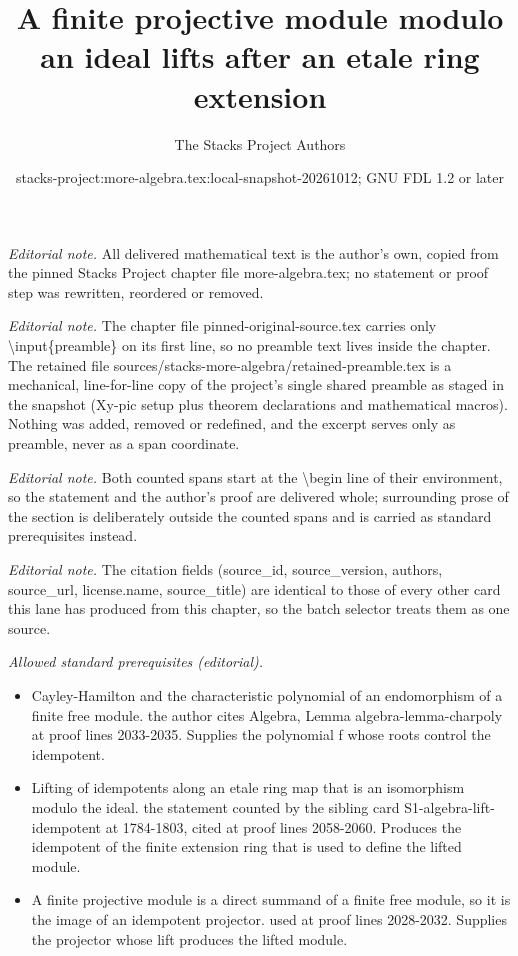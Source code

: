 \documentclass[10pt,a4paper]{amsart}
\title{A finite projective module modulo an ideal lifts after an etale ring extension}
\author{The Stacks Project Authors}
\date{stacks-project:more-algebra.tex:local-snapshot-20261012; GNU FDL 1.2 or later}
\theoremstyle{plain}
\theoremstyle{definition}
\theoremstyle{remark}
\numberwithin{equation}{subsection}
\begin{document}
\maketitle
\setcounter{subsection}{1}
\noindent\textit{Editorial note.} All delivered mathematical text is the author's own, copied from the pinned Stacks Project chapter file more-algebra.tex; no statement or proof step was rewritten, reordered or removed.\par\medskip
\noindent\textit{Editorial note.} The chapter file pinned-original-source.tex carries only \textbackslash{}input\{preamble\} on its first line, so no preamble text lives inside the chapter. The retained file sources/stacks-more-algebra/retained-preamble.tex is a mechanical, line-for-line copy of the project's single shared preamble as staged in the snapshot (Xy-pic setup plus theorem declarations and mathematical macros). Nothing was added, removed or redefined, and the excerpt serves only as preamble, never as a span coordinate.\par\medskip
\noindent\textit{Editorial note.} Both counted spans start at the \textbackslash{}begin line of their environment, so the statement and the author's proof are delivered whole; surrounding prose of the section is deliberately outside the counted spans and is carried as standard prerequisites instead.\par\medskip
\noindent\textit{Editorial note.} The citation fields (source\_id, source\_version, authors, source\_url, license.name, source\_title) are identical to those of every other card this lane has produced from this chapter, so the batch selector treats them as one source.\par\medskip
\noindent\textit{Allowed standard prerequisites (editorial).}\begin{itemize}
\item Cayley-Hamilton and the characteristic polynomial of an endomorphism of a finite free module. the author cites Algebra, Lemma algebra-lemma-charpoly at proof lines 2033-2035. Supplies the polynomial f whose roots control the idempotent.
\item Lifting of idempotents along an etale ring map that is an isomorphism modulo the ideal. the statement counted by the sibling card S1-algebra-lift-idempotent at 1784-1803, cited at proof lines 2058-2060. Produces the idempotent of the finite extension ring that is used to define the lifted module.
\item A finite projective module is a direct summand of a finite free module, so it is the image of an idempotent projector. used at proof lines 2028-2032. Supplies the projector whose lift produces the lifted module.
\end{itemize}\medskip
\end{document}
